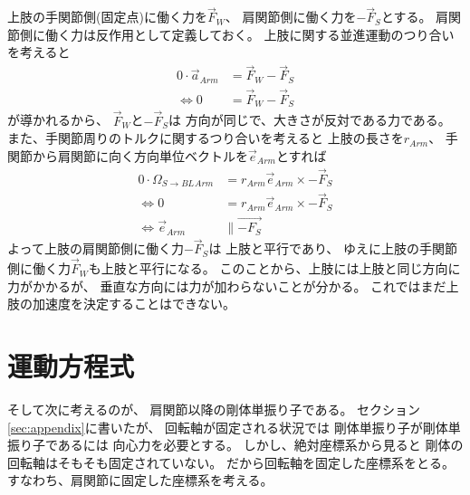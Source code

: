 \documentclass[a4paper,11pt]{jsarticle}
\begin{document}
上肢の手関節側(固定点)に働く力を$\vec{F}_W$、
肩関節側に働く力を$-\vec{F}_S$とする。
肩関節側に働く力は反作用として定義しておく。
上肢に関する並進運動のつり合いを考えると
\begin{align*}
  0 \cdot \vec{a}_{Arm} &= \vec{F}_W - \vec{F}_S
  \\
  \Leftrightarrow
  0 &= \vec{F}_W - \vec{F}_S
\end{align*}
が導かれるから、
$\vec{F}_W$と$-\vec{F}_S$は
方向が同じで、大きさが反対である力である。
また、手関節周りのトルクに関するつり合いを考えると
上肢の長さを$r_{Arm}$、
手関節から肩関節に向く方向単位ベクトルを$\vec{e}_{Arm}$とすれば
\begin{align*}
  0 \cdot \Omega_{S\rightarrow BL}{}_{Arm} &= r_{Arm} \vec{e}_{Arm} \times -\vec{F}_S
  \\
  \Leftrightarrow
  0 &= r_{Arm} \vec{e}_{Arm} \times -\vec{F}_S
  \\
  \Leftrightarrow
  \vec{e}_{Arm} &\parallel \vec{-F_S}
\end{align*}
よって上肢の肩関節側に働く力$-\vec{F}_S$は
上肢と平行であり、
ゆえに上肢の手関節側に働く力$\vec{F}_W$も上肢と平行になる。
このことから、上肢には上肢と同じ方向に力がかかるが、
垂直な方向には力が加わらないことが分かる。
これではまだ上肢の加速度を決定することはできない。

\section{運動方程式}

そして次に考えるのが、
肩関節以降の剛体単振り子である。
セクション\ref{sec:appendix}に書いたが、
回転軸が固定される状況では
剛体単振り子が剛体単振り子であるには
向心力を必要とする。
しかし、絶対座標系から見ると
剛体の回転軸はそもそも固定されていない。
だから回転軸を固定した座標系をとる。
すなわち、肩関節に固定した座標系を考える。
\end{document}
